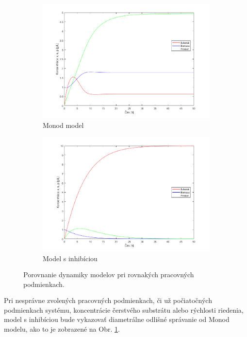 \begin{figure}[H]
	\begin{subfigure}{.5\textwidth}
		\centering
		\includegraphics[width=1\linewidth]{images/dyn_wo_inhb}
		\caption[]{Monod model}
	\end{subfigure}
	\begin{subfigure}{.5\textwidth}
		\centering
		\includegraphics[width=1\linewidth]{images/dyn_inhb}
		\caption[]{Model s inhibíciou}
	\end{subfigure}
	\caption{Porovnanie dynamiky modelov pri rovnakých pracovných podmienkach.}
	\label{fig:3}
\end{figure}

\noindent Pri nesprávne zvolených pracovných podmienkach, či už počiatočných podmienkach systému, koncentrácie čerstvého substrátu alebo rýchlosti riedenia, model s inhibíciou bude vykazovať diametrálne odlišné správanie od Monod modelu, ako to je zobrazené na Obr. \ref{fig:3}.